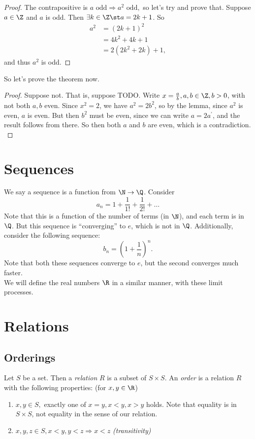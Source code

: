 \documentclass{notes}
\begin{document}
\begin{proof}
The contrapositive is $a\text{ odd}\Rightarrow a^2\text{ odd},$ so let's try and prove that. Suppose
$a\in\Z$ and $a$ is odd. Then $\exists k\in\Z \st a = 2k + 1$. So 
\begin{align*}
  a^2 &= (2k + 1)^2 \\
  &= 4k^2 + 4k + 1 \\
  &= 2(2k^2 + 2k) + 1,
\end{align*}
and thus $a^2$ is odd. 
\end{proof}

So let's prove the theorem now. 

\begin{proof}
  Suppose not. That is, suppose TODO. Write $x = \frac{a}{b}, a,b\in\Z,
  b >0$, with not both $a,b$ even. Since $x^2 = 2$, we have $a^2 = 2b^2$, so by the lemma, since $a^2$ 
  is even, $a$ is even. But then $b^2$ must be even, since we can write $a = 2a^\prime$, and the result
  follows from there. So then both $a$ and $b$ are even, which is a contradiction. \\
\end{proof}

\section{Sequences}
We say a sequence is a function from $\N\to\Q$. Consider $$a_n = 1 + \frac{1}{1!} + \frac{1}{2!} + \ldots$$ 
Note that this is a function of the number of terms (in $\N$), and each term is in $\Q$. But this sequence
is ``converging'' to $e$, which is not in $\Q$. Additionally, consider the following sequence:
$$b_n = (1 + \frac{1}{n})^n.$$
Note that both these sequences converge to $e$, but the second converges much faster.\\

We will define the real numbers $\R$ in a similar manner, with these limit processes.

\section{Relations}
\subsection{Orderings}
Let $S$ be a set. Then a \emph{relation} $R$ is a subset of $S\times S$. An \emph{order} is a relation
$R$ with the following properties: (for $x,y\in\R$)
\begin{enumerate}
\item $x,y\in S,$ exactly one of $x = y, x < y, x> y$ holds. Note that equality is in $S\times S$, not
  equality in the sense of our relation.
\item $x,y,z\in S, x<y, y<z \Rightarrow x<z$ \emph{(transitivity)}
\end{enumerate}
\end{document}
